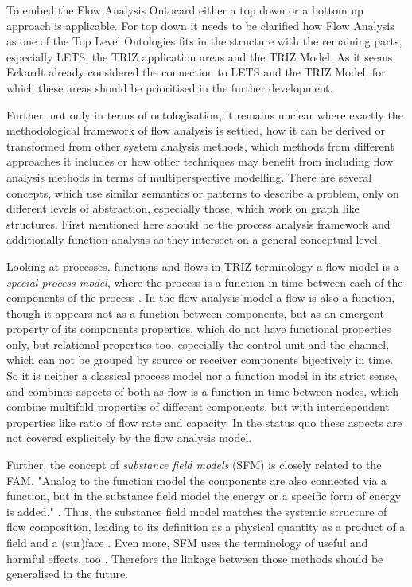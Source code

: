 \documentclass[a4paper,11pt]{article}
\begin{document}
To embed the Flow Analysis Ontocard either a top down or a bottom up approach
is applicable. For top down it needs to be clarified how Flow Analysis as one
of the Top Level Ontologies fits in the structure with the remaining parts,
especially LETS, the TRIZ application areas and the TRIZ Model. As it seems
Eckardt already considered the connection to LETS and the TRIZ Model, for
which these areas should be prioritised in the further development.

Further, not only in terms of ontologisation, it remains unclear where 
exactly the metho\-do\-logical framework of flow analysis is settled, how 
it can be derived or transformed from other system analysis methods, 
which methods from different approaches it includes or how other 
techniques may benefit from including flow analysis methods in terms of
multiperspective modelling. There are several concepts, which use 
similar semantics or patterns to describe a problem, only on different 
levels of abstraction, especially those, which work on graph like 
structures. First mentioned here should be the process analysis 
framework and additionally function analysis as they intersect on a 
general conceptual level.

Looking at processes, functions and flows in TRIZ terminology
\cite{Souchkov2018} \cite{Eckardt2020} a flow model is a \emph{special process
  model}, where the process is a function in time between each of the
components of the process \cite{KoltzeSouchkov2017}. In the flow analysis
model a flow is also a function, though it appears not as a function between
components, but as an emergent property of its components properties, which do
not have functional properties only, but relational properties too, especially
the control unit and the channel, which can not be grouped by source or
receiver components bijectively in time. So it is neither a classical process
model nor a function model in its strict sense, and combines aspects of both
as flow is a function in time between nodes, which combine multifold
properties of different components, but with interdependent properties like
ratio of flow rate and capacity. In the status quo these aspects are not
covered explicitely by the flow analysis model.

Further, the concept of \emph{substance field models} (SFM) is closely related
to the FAM. "Analog to the function model the components are also connected
via a function, but in the substance field model the energy or a specific form
of energy is added." \cite{KoltzeSouchkov2017}. Thus, the substance field
model matches the systemic structure of flow composition, leading to its
definition as a physical quantity as a product of a field and a (sur)face
\cite{Flussdefinition(Physik)}.  Even more, SFM uses the terminology of useful
and harmful effects, too \cite{KoltzeSouchkov2017}. Therefore the linkage
between those methods should be generalised in the future.
\end{document}
